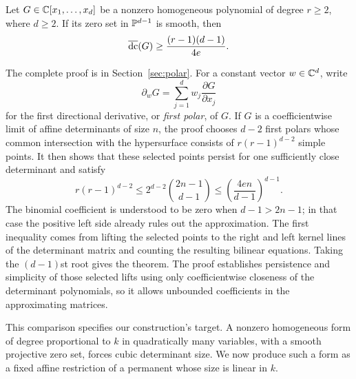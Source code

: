 \begin{theorem}
\label{thm:smooth-border}
Let $G\in\mathbb C[x_1,\ldots,x_d]$ be a nonzero homogeneous polynomial of degree
$r\ge2$, where $d\ge2$. If its zero set in $\mathbb P^{d-1}$ is smooth, then
\[
 \operatorname{\overline{dc}}(G)\ge \frac{(r-1)(d-1)}{4e}.
\]
\end{theorem}

The complete proof is in Section~\ref{sec:polar}. For a constant vector
$w\in\mathbb C^d$, write
\[
 \partial_wG=\sum_{j=1}^d w_j\frac{\partial G}{\partial x_j}
\]
for the first directional derivative, or \emph{first polar}, of $G$.
If $G$ is a coefficientwise limit of affine determinants of size $n$, the proof
chooses $d-2$ first polars whose common intersection with the hypersurface
consists of $r(r-1)^{d-2}$ simple points. It then shows that these selected
points persist for one sufficiently close determinant and satisfy
\begin{equation}
 r(r-1)^{d-2}
 \le 2^{d-2}\binom{2n-1}{d-1}
 \le \left(\frac{4en}{d-1}\right)^{d-1}.
 \label{eq:smooth-count-synopsis}
\end{equation}
The binomial coefficient is understood to be zero when $d-1>2n-1$;
in that case the positive left side already rules out the approximation.
The first inequality comes from lifting the selected points to the right
and left kernel lines of the determinant matrix and counting the resulting
bilinear equations. Taking the $(d-1)$st root gives the theorem. The proof
establishes persistence and simplicity of those selected lifts using only
coefficientwise closeness of the determinant polynomials, so it allows
unbounded coefficients in the approximating matrices.

This comparison specifies our construction's target. A nonzero homogeneous
form of degree proportional to $k$ in quadratically many variables, with
a smooth projective zero set, forces cubic determinant size. We now produce
such a form as a fixed affine restriction of a permanent whose size is
linear in $k$.
